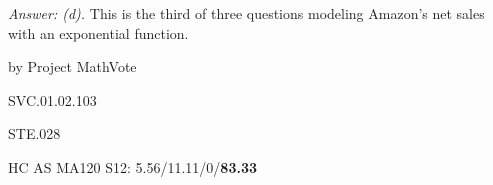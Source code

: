 {\it Answer: (d).}  This is the third of three questions modeling Amazon's net sales with an exponential function.

\medskip
by Project MathVote

SVC.01.02.103

STE.028

HC AS MA120 S12: 5.56/11.11/0/{\bf83.33}  \\
